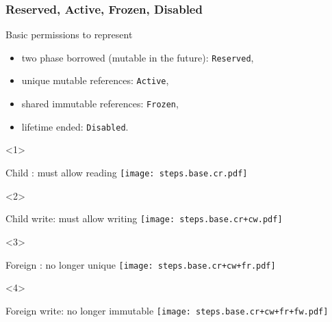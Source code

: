 \begin{frame}[t]
    \frametitle{Reserved, Active, Frozen, Disabled}
    Basic permissions to represent
    \begin{itemize}
        \item two phase borrowed (mutable in the future): \texttt{Reserved},
        \item unique mutable references: \texttt{Active},
        \item shared immutable references: \texttt{Frozen},
        \item lifetime ended: \texttt{Disabled}.
    \end{itemize}

    \begin{onlyenv}<1>
        \begin{block}{Child : must allow reading}
        \texttt{[image: steps.base.cr.pdf]}
        \end{block}
    \end{onlyenv}

    \begin{onlyenv}<2>
        \begin{block}{Child write: must allow writing}
        \texttt{[image: steps.base.cr+cw.pdf]}
        \end{block}
    \end{onlyenv}

    \begin{onlyenv}<3>
        \begin{block}{Foreign : no longer unique}
        \texttt{[image: steps.base.cr+cw+fr.pdf]}
        \end{block}
    \end{onlyenv}

    \begin{onlyenv}<4>
        \begin{block}{Foreign write: no longer immutable}
        \texttt{[image: steps.base.cr+cw+fr+fw.pdf]}
        \end{block}
    \end{onlyenv}
\end{frame}

